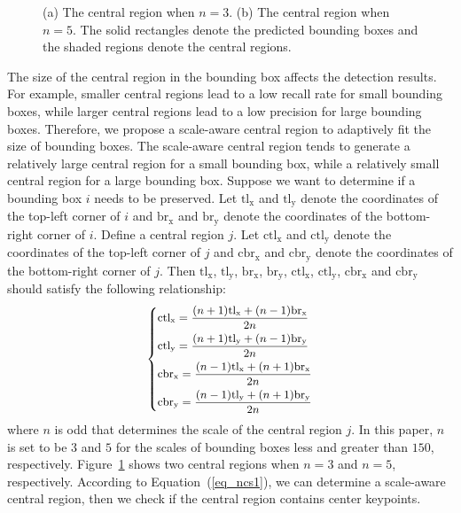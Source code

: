 \documentclass[10pt,twocolumn,letterpaper]{article}
\begin{document}
\begin{figure}[tb]
  \centering 
  \vspace{-2ex}
  \caption{(a) The central region when $n=3$. (b) The central region when $n=5$. The solid rectangles denote the predicted bounding boxes and the shaded regions denote the central regions.}
  \label{fig_ncs}
\end{figure}
The size of the central region in the bounding box affects the detection results. For example, smaller central regions lead to a low recall rate for small bounding boxes, while larger central regions lead to a low precision for large bounding boxes. Therefore, we propose a scale-aware central region to adaptively fit the size of bounding boxes. The scale-aware central region tends to generate a relatively large central region for a small bounding box, while a relatively small central region for a large bounding box. Suppose we want to determine if a bounding box $i$ needs to be preserved. Let $\mathrm{tl_{x}}$ and $\mathrm{tl_{y}}$ denote the coordinates of the top-left corner of $i$ and $\mathrm{br_{x}}$ and $\mathrm{br_{y}}$ denote the coordinates of the bottom-right corner of $i$. Define a central region $j$. Let $\mathrm{ctl_{x}}$ and $\mathrm{ctl_{y}}$ denote the coordinates of the top-left corner of $j$ and $\mathrm{cbr_{x}}$ and $\mathrm{cbr_{y}}$ denote the coordinates of the bottom-right corner of $j$. Then $\mathrm{tl_{x}}$, $\mathrm{tl_{y}}$, $\mathrm{br_{x}}$, $\mathrm{br_{y}}$, $\mathrm{ctl_{x}}$, $\mathrm{ctl_{y}}$, $\mathrm{cbr_{x}}$ and $\mathrm{cbr_{y}}$ should satisfy the following relationship:
\begin{equation} \label{eq_ncs1}
\small
\left\{
\begin{aligned}
&\mathrm{ctl_{x}} = \frac{(n+1)\mathrm{tl_{x}}+(n-1)\mathrm{br_{x}}}{2n} \\
&\mathrm{ctl_{y}} = \frac{(n+1)\mathrm{tl_{y}}+(n-1)\mathrm{br_{y}}}{2n} \\
&\mathrm{cbr_{x}} = \frac{(n-1)\mathrm{tl_{x}}+(n+1)\mathrm{br_{x}}}{2n} \\
&\mathrm{cbr_{y}} = \frac{(n-1)\mathrm{tl_{y}}+(n+1)\mathrm{br_{y}}}{2n} \\
\end{aligned}
\right.
\end{equation}
where $n$ is odd that determines the scale of the central region $j$. In this paper, $n$ is set to be $3$ and $5$ for the scales of bounding boxes less and greater than $150$, respectively. Figure~\ref{fig_ncs} shows two central regions when $n=3$ and $n=5$, respectively. According to Equation~(\ref{eq_ncs1}), we can determine a scale-aware central region, then we check if the central region contains center keypoints.
\end{document}
